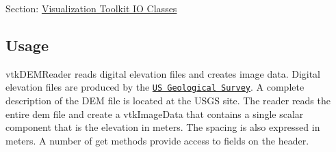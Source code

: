 Section\-: \hyperlink{sec_vtkio}{Visualization Toolkit I\-O Classes} \hypertarget{vtkwidgets_vtkxyplotwidget_Usage}{}\subsection{Usage}\label{vtkwidgets_vtkxyplotwidget_Usage}
vtk\-D\-E\-M\-Reader reads digital elevation files and creates image data. Digital elevation files are produced by the \href{http://www.usgs.gov}{\tt U\-S Geological Survey}. A complete description of the D\-E\-M file is located at the U\-S\-G\-S site. The reader reads the entire dem file and create a vtk\-Image\-Data that contains a single scalar component that is the elevation in meters. The spacing is also expressed in meters. A number of get methods provide access to fields on the header.

